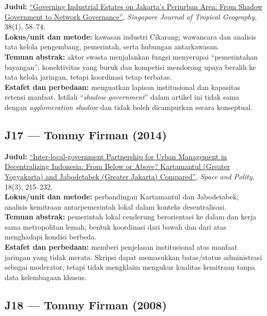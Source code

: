 \documentclass[
  indonesian,
  11pt,
  a4paper,
  oneside,
  openany]{report}
\begin{document}
\textbf{Judul:} \href{https://doi.org/10.1111/sjtg.12177}{``Governing
Industrial Estates on Jakarta's Periurban Area: From Shadow Government
to Network Governance''}, \emph{Singapore Journal of Tropical
Geography}, 38(1), 58--74.\\
\textbf{Lokus/unit dan metode:} kawasan industri Cikarang; wawancara dan
analisis tata kelola pengembang, pemerintah, serta hubungan
antarkawasan.\\
\textbf{Temuan abstrak:} aktor swasta menjalankan fungsi menyerupai
``pemerintahan bayangan''; konektivitas yang buruk dan kompetisi
mendorong upaya beralih ke tata kelola jaringan, tetapi koordinasi tetap
terbatas.\\
\textbf{Estafet dan perbedaan:} menguatkan lapisan institusional dan
kapasitas retensi manfaat. Istilah ``\emph{shadow government}'' dalam
artikel ini tidak sama dengan \emph{agglomeration shadow} dan tidak
boleh dicampurkan secara konseptual.

\subsection{J17 --- Tommy Firman (2014)}\label{j17-tommy-firman-2014}

\textbf{Judul:}
\href{https://doi.org/10.1080/13562576.2014.959252}{``Inter-local-government
Partnership for Urban Management in Decentralizing Indonesia: From Below
or Above? Kartamantul (Greater Yogyakarta) and Jabodetabek (Greater
Jakarta) Compared''}, \emph{Space and Polity}, 18(3), 215--232.\\
\textbf{Lokus/unit dan metode:} perbandingan Kartamantul dan
Jabodetabek; analisis kemitraan antarpemerintah lokal dalam konteks
desentralisasi.\\
\textbf{Temuan abstrak:} pemerintah lokal cenderung berorientasi ke
dalam dan kerja sama metropolitan lemah; bentuk koordinasi dari bawah
dan dari atas menghadapi kondisi berbeda.\\
\textbf{Estafet dan perbedaan:} memberi penjelasan institusional atas
manfaat jaringan yang tidak merata. Skripsi dapat memasukkan
batas/status administrasi sebagai moderator, tetapi tidak mengklaim
mengukur kualitas kemitraan tanpa data kelembagaan khusus.

\subsection{J18 --- Tommy Firman (2008)}\label{j18-tommy-firman-2008}
\end{document}
